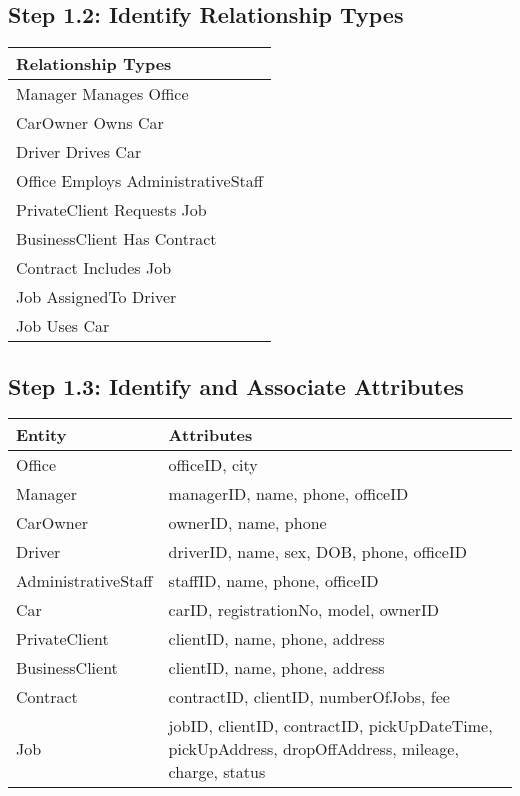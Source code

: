 \documentclass[a4paper,12pt]{article}
\begin{document}
\subsection*{Step 1.2: Identify Relationship Types}
\begin{table}[H]
\centering
\begin{tabularx}{\textwidth}{|X|}
\hline
\rowcolor{blue!20} \textbf{Relationship Types} \\
\hline
Manager Manages Office \\
\hline
CarOwner Owns Car \\
\hline
Driver Drives Car \\
\hline
Office Employs AdministrativeStaff \\
\hline
PrivateClient Requests Job \\
\hline
BusinessClient Has Contract \\
\hline
Contract Includes Job \\
\hline
Job AssignedTo Driver \\
\hline
Job Uses Car \\
\hline
\end{tabularx}
\end{table}

\subsection*{Step 1.3: Identify and Associate Attributes}
\begin{table}[H]
\centering
\begin{tabularx}{\textwidth}{|X|X|}
\hline
\rowcolor{blue!20} \textbf{Entity} & \textbf{Attributes} \\
\hline
Office & officeID, city \\
\hline
Manager & managerID, name, phone, officeID \\
\hline
CarOwner & ownerID, name, phone \\
\hline
Driver & driverID, name, sex, DOB, phone, officeID \\
\hline
AdministrativeStaff & staffID, name, phone, officeID \\
\hline
Car & carID, registrationNo, model, ownerID \\
\hline
PrivateClient & clientID, name, phone, address \\
\hline
BusinessClient & clientID, name, phone, address \\
\hline
Contract & contractID, clientID, numberOfJobs, fee \\
\hline
Job & jobID, clientID, contractID, pickUpDateTime, pickUpAddress, dropOffAddress, mileage, charge, status \\
\hline
\end{tabularx}
\end{table}
\end{document}
